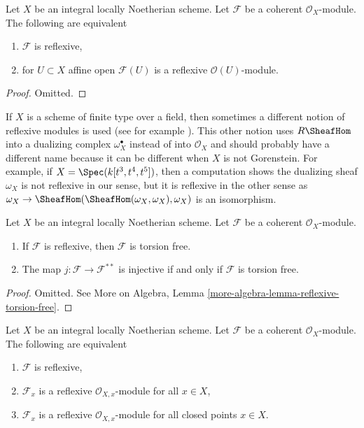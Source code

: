 \begin{lemma}
\label{lemma-check-reflexive-on-affines}
Let $X$ be an integral locally Noetherian scheme. Let $\mathcal{F}$ be a
coherent $\mathcal{O}_X$-module. The following are equivalent
\begin{enumerate}
\item $\mathcal{F}$ is reflexive,
\item for $U \subset X$ affine open $\mathcal{F}(U)$
is a reflexive $\mathcal{O}(U)$-module.
\end{enumerate}
\end{lemma}

\begin{proof}
Omitted.
\end{proof}

\begin{remark}
\label{remark-different-reflexive}
If $X$ is a scheme of finite type over a field, then sometimes a different
notion of reflexive modules is used (see for example
\cite[bottom of page 5 and Definition 1.1.9]{HL}).
This other notion uses $R\SheafHom$ into a dualizing complex
$\omega_X^\bullet$ instead of into $\mathcal{O}_X$ and
should probably have a different name because it can be different
when $X$ is not Gorenstein. For example, if
$X = \Spec(k[t^3, t^4, t^5])$, then a computation shows the dualizing
sheaf $\omega_X$ is not reflexive in our sense, but it is reflexive in the
other sense as
$\omega_X \to \SheafHom(\SheafHom(\omega_X, \omega_X), \omega_X)$
is an isomorphism.
\end{remark}

\begin{lemma}
\label{lemma-reflexive-torsion-free}
Let $X$ be an integral locally Noetherian scheme. Let $\mathcal{F}$
be a coherent $\mathcal{O}_X$-module.
\begin{enumerate}
\item If $\mathcal{F}$ is reflexive, then $\mathcal{F}$ is torsion free.
\item The map $j : \mathcal{F} \longrightarrow \mathcal{F}^{**}$
is injective if and only if $\mathcal{F}$ is torsion free.
\end{enumerate}
\end{lemma}

\begin{proof}
Omitted. See More on Algebra, Lemma
\ref{more-algebra-lemma-reflexive-torsion-free}.
\end{proof}

\begin{lemma}
\label{lemma-check-reflexive}
Let $X$ be an integral locally Noetherian scheme.
Let $\mathcal{F}$ be a coherent $\mathcal{O}_X$-module.
The following are equivalent
\begin{enumerate}
\item $\mathcal{F}$ is reflexive,
\item $\mathcal{F}_x$ is a reflexive $\mathcal{O}_{X, x}$-module
for all $x \in X$,
\item $\mathcal{F}_x$ is a reflexive $\mathcal{O}_{X, x}$-module
for all closed points $x \in X$.
\end{enumerate}
\end{lemma}

